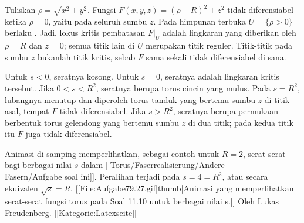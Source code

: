 
Tuliskan $\rho=\sqrt{x^2+y^2}$. Fungsi
$F(x,y,z)=(\rho-R)^2+z^2$ tidak diferensiabel ketika $\rho=0$, yaitu pada seluruh sumbu $z$. Pada himpunan terbuka $U=\{\rho>0\}$ berlaku
 { . }
Jadi, lokus kritis pembatasan $F\vert_U$ adalah lingkaran yang diberikan oleh $\rho=R$ dan $z=0$; semua titik lain di $U$ merupakan titik reguler. Titik-titik pada sumbu $z$ bukanlah titik kritis, sebab $F$ sama sekali tidak diferensiabel di sana.

Untuk $s<0$, seratnya kosong. Untuk $s=0$, seratnya adalah lingkaran kritis tersebut. Jika $0<s<R^2$, seratnya berupa torus cincin yang mulus. Pada $s=R^2$, lubangnya menutup dan diperoleh torus tanduk yang bertemu sumbu $z$ di titik asal, tempat $F$ tidak diferensiabel. Jika $s>R^2$, seratnya berupa permukaan berbentuk torus gelendong yang bertemu sumbu $z$ di dua titik; pada kedua titik itu $F$ juga tidak diferensiabel.

Animasi di samping memperlihatkan, sebagai contoh untuk $R=2$, serat-serat bagi berbagai nilai $s$ dalam [[Torus/Faserrealisierung/Andere Fasern/Aufgabe|soal ini]]. Peralihan terjadi pada $s=4=R^2$, atau secara ekuivalen $\sqrt{s}=R$.
[[File:Aufgabe79.27.gif|thumb|Animasi yang memperlihatkan serat-serat fungsi torus pada Soal 11.10 untuk berbagai nilai s.]]
Oleh Lukas Freudenberg. [[Kategorie:Latexseite]]
